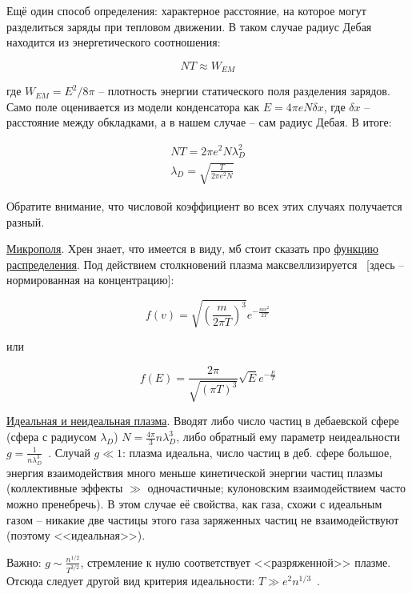 \documentclass[10pt, a4paper]{article}
\begin{document}
\begin{itemize}
	Ещё один способ определения: характерное расстояние, на которое могут разделиться заряды при тепловом движении. В таком случае радиус Дебая находится из энергетического соотношения:
	
	\begin{equation*}
		NT \approx W_{EM}
	\end{equation*}

	где $W_{EM}=E^2/8\pi$ -- плотность энергии статического поля разделения зарядов. Само поле оценивается из модели конденсатора как $E=4\pi e N \delta x$, где $\delta x$ -- расстояние между обкладками, а в нашем случае -- сам радиус Дебая. В итоге:
	
	\begin{align*}
		NT = 2\pi e^2 N \lambda_D^2 \\
		\lambda_D = \sqrt{\frac{T}{2\pi e^2 N}}		
	\end{align*}

	Обратите внимание, что числовой коэффициент во всех этих случаях получается разный.
\end{itemize}

\uline{Микрополя}. Хрен знает, что имеется в виду, мб стоит сказать про \uline{функцию распределения}. Под действием столкновений плазма максвеллизируется~\cite{kroll} [здесь -- нормированная на концентрацию]:

\begin{equation}
	f(v) = \sqrt{\left( \frac{m}{2\pi T}\right)^3} e^{-\frac{mv^2}{2T}}
\end{equation}

или

\begin{equation}
	f(E) = \frac{2\pi}{\sqrt{\left(\pi T\right)^3}}\sqrt{E} e^{-\frac{E}{T}}
\end{equation}

\uline{Идеальная и неидеальная плазма}. Вводят либо число частиц в дебаевской сфере (сфера с радиусом $\lambda_D$) $N = \frac{4\pi}{3}n\lambda_D^3$, либо обратный ему параметр неидеальности $g = \frac{1}{n\lambda_D^3}$~\cite{kroll}. Случай $g \ll 1$: плазма идеальна, число частиц в деб. сфере большое, энергия взаимодействия много меньше кинетической энергии частиц плазмы (коллективные эффекты $\gg$ одночастичные; кулоновским взаимодействием часто можно пренебречь). В этом случае её свойства, как газа, схожи с идеальным газом -- никакие две частицы этого газа заряженных частиц не взаимодействуют (поэтому <<идеальная>>).

Важно: $g \sim \frac{n^{1/2}}{T^{3/2}}$, стремление к нулю соответствует <<разряженной>> плазме. Отсюда следует другой вид критерия идеальности: $T \gg e^2 n^{1/3}$~\cite{kotelnikov}.
\end{document}
